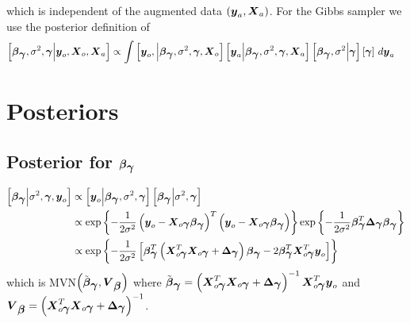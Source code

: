 \documentclass[fleqn]{article}
\def\bm#1{\mbox{\boldmath $#1$}}
\begin{document}
%
which is independent of the augmented data $\left( \bm{y}_a, \bm{X}_a \right)$. For the Gibbs sampler we use the posterior definition of
\begin{align*}
\left[ \bm{\beta}_{\bm{\gamma}}, \sigma^2, \bm{\gamma} \middle| \bm{y}_o, \bm{X}_o, \bm{X}_a \right] & \propto \int \left[ \bm{y}_o, \middle| \bm{\beta}_{\bm{\gamma}}, \sigma^2, \bm{\gamma}, \bm{X}_o \right] \left[ \bm{y}_a \middle| \bm{\beta}_{\bm{\gamma}}, \sigma^2, \bm{\gamma}, \bm{X}_a \right] \left[ \bm{\beta}_{\bm{\gamma}}, \sigma^2 \middle| \bm{\gamma} \right] \left[ \bm{\gamma} \right] \, d \bm{y}_a
\end{align*}
\section{Posteriors}
\subsection{Posterior for $\bm{\beta}_{\bm{\gamma}}$}
%
\begin{align*}
%
\left[ \bm{\beta}_{\bm{\gamma}} \middle| \sigma^2, \bm{\gamma}, \bm{y}_o \right] & \propto \left[ \bm{y}_o \middle| \bm{\beta}_{\bm{\gamma}}, \sigma^2, \bm{\gamma} \right] \left[ \bm{\beta}_{\bm{\gamma}} \middle| \sigma^2, \bm{\gamma} \right] \\
%
& \propto \exp{ \left\{ - \frac{1} {2 \sigma^2} \left( \bm{y}_o - \bm{X}_{o \bm{\gamma}} \bm{\beta}_{\bm{\gamma}} \right)^T \left( \bm{y}_o - \bm{X}_{o \bm{\gamma}} \bm{\beta}_{\bm{\gamma}} \right) \right\} } \exp{ \left\{ - \frac{1} {2 \sigma^2} \bm{\beta}_{\bm{\gamma}}^T \bm{\Delta}_{\bm{\gamma}} \bm{\beta}_{\bm{\gamma}} \right\} } \\
%
& \propto \exp{ \left\{ - \frac{1} {2 \sigma^2} \left[ \bm{\beta}_{\bm{\gamma}}^T \left( \bm{X}_{o \bm{\gamma}}^T \bm{X}_{o \bm{\gamma}} + \bm{\Delta}_{\bm{\gamma}} \right) \bm{\beta}_{\bm{\gamma}} - 2 \bm{\beta}_{\bm{\gamma}}^T \bm{X}_{o \bm{\gamma}}^T \bm{y}_o \right] \right\} }
%
\end{align*}
%
which is MVN$\left( \tilde{\bm{\beta}}_{\bm{\gamma}}, \bm{V}_{\bm{\beta}} \right)$ where $\tilde{\bm{\beta}}_{\bm{\gamma}} = \left( \bm{X}_{o \bm{\gamma}}^T \bm{X}_{o \bm{\gamma}} + \bm{\Delta}_{\bm{\gamma}} \right)^{ - 1}\bm{X}_{o \bm{\gamma}}^T \bm{y}_o$ and $\bm{V}_{\bm{\beta}} = \left( \bm{X}_{o \bm{\gamma}}^T \bm{X}_{o \bm{\gamma}} + \bm{\Delta}_{\bm{\gamma}} \right)^{ - 1}$.
\end{document}
